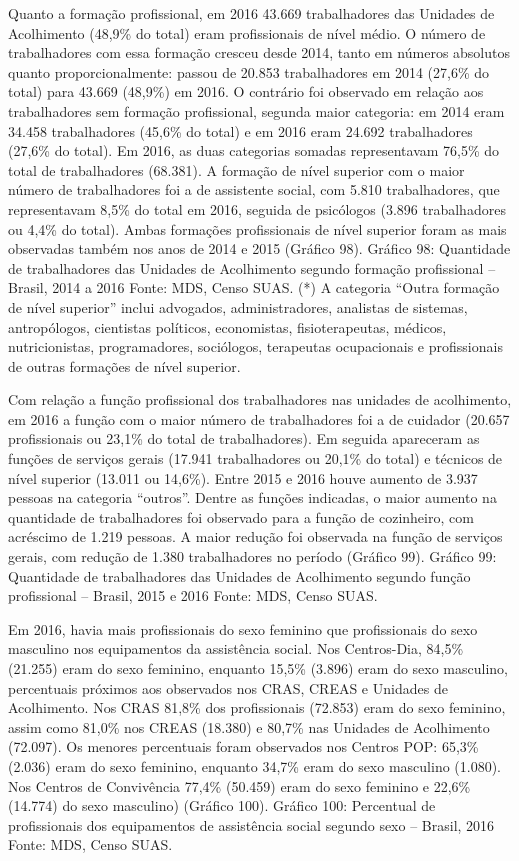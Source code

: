 \documentclass[
  brazilian]{report}
\begin{document}
Quanto a formação profissional, em 2016 43.669 trabalhadores das
Unidades de Acolhimento (48,9\% do total) eram profissionais de nível
médio. O número de trabalhadores com essa formação cresceu desde 2014,
tanto em números absolutos quanto proporcionalmente: passou de 20.853
trabalhadores em 2014 (27,6\% do total) para 43.669 (48,9\%) em 2016. O
contrário foi observado em relação aos trabalhadores sem formação
profissional, segunda maior categoria: em 2014 eram 34.458 trabalhadores
(45,6\% do total) e em 2016 eram 24.692 trabalhadores (27,6\% do total).
Em 2016, as duas categorias somadas representavam 76,5\% do total de
trabalhadores (68.381). A formação de nível superior com o maior número
de trabalhadores foi a de assistente social, com 5.810 trabalhadores,
que representavam 8,5\% do total em 2016, seguida de psicólogos (3.896
trabalhadores ou 4,4\% do total). Ambas formações profissionais de nível
superior foram as mais observadas também nos anos de 2014 e 2015
(Gráfico 98). Gráfico 98: Quantidade de trabalhadores das Unidades de
Acolhimento segundo formação profissional -- Brasil, 2014 a 2016 Fonte:
MDS, Censo SUAS. (*) A categoria ``Outra formação de nível superior''
inclui advogados, administradores, analistas de sistemas, antropólogos,
cientistas políticos, economistas, fisioterapeutas, médicos,
nutricionistas, programadores, sociólogos, terapeutas ocupacionais e
profissionais de outras formações de nível superior.

Com relação a função profissional dos trabalhadores nas unidades de
acolhimento, em 2016 a função com o maior número de trabalhadores foi a
de cuidador (20.657 profissionais ou 23,1\% do total de trabalhadores).
Em seguida apareceram as funções de serviços gerais (17.941
trabalhadores ou 20,1\% do total) e técnicos de nível superior (13.011
ou 14,6\%). Entre 2015 e 2016 houve aumento de 3.937 pessoas na
categoria ``outros''. Dentre as funções indicadas, o maior aumento na
quantidade de trabalhadores foi observado para a função de cozinheiro,
com acréscimo de 1.219 pessoas. A maior redução foi observada na função
de serviços gerais, com redução de 1.380 trabalhadores no período
(Gráfico 99). Gráfico 99: Quantidade de trabalhadores das Unidades de
Acolhimento segundo função profissional -- Brasil, 2015 e 2016 Fonte:
MDS, Censo SUAS.

Em 2016, havia mais profissionais do sexo feminino que profissionais do
sexo masculino nos equipamentos da assistência social. Nos Centros-Dia,
84,5\% (21.255) eram do sexo feminino, enquanto 15,5\% (3.896) eram do
sexo masculino, percentuais próximos aos observados nos CRAS, CREAS e
Unidades de Acolhimento. Nos CRAS 81,8\% dos profissionais (72.853) eram
do sexo feminino, assim como 81,0\% nos CREAS (18.380) e 80,7\% nas
Unidades de Acolhimento (72.097). Os menores percentuais foram
observados nos Centros POP: 65,3\% (2.036) eram do sexo feminino,
enquanto 34,7\% eram do sexo masculino (1.080). Nos Centros de
Convivência 77,4\% (50.459) eram do sexo feminino e 22,6\% (14.774) do
sexo masculino) (Gráfico 100). Gráfico 100: Percentual de profissionais
dos equipamentos de assistência social segundo sexo -- Brasil, 2016
Fonte: MDS, Censo SUAS.
\end{document}
